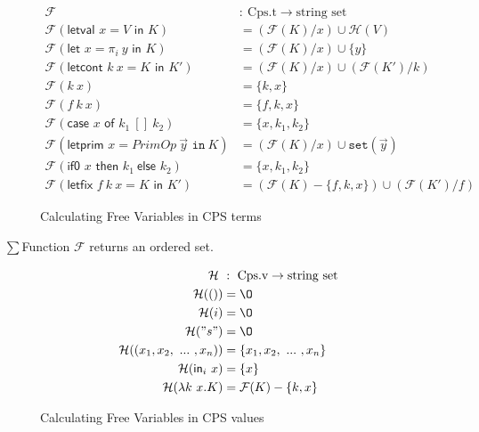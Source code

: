 \documentclass{article}
\theoremstyle{definition}
\theoremstyle{remark}
\numberwithin{equation}{section}
\begin{document}
\begin{figure}[!ht]
  \centering
\begin{align*}
\mathcal{F}\ &:\ \textrm{Cps.t} \to \textrm{string set}\\     %
\mathcal{F}(\textsf{letval }x=V\textsf{ in }K)
    &=(\mathcal{F}(K)/x)\cup \mathcal{H}(V)\\   %
\mathcal{F}(\textsf{let }x=\pi _i\ y\textsf{ in }K)
    &=(\mathcal{F}(K)/x)\cup \{y\}\\   %
\mathcal{F}(\textsf{letcont }k\ x=K\textsf{ in }K')
    &=(\mathcal{F}(K)/x)\cup (\mathcal{F}(K')/k)\\   %
\mathcal{F}(k\ x)
    &=\{k, x\}\\   %
\mathcal{F}(f\ k\ x)
    &=\{f, k, x\}\\   %
\mathcal{F}(\textsf{case }x\textsf{ of }k_1\ [\!]\ k_2)
    &=\{x, k_1, k_2\}\\   %
\mathcal{F}(\textsf{letprim }x=PrimOp\ \vec{y}\texttt{ in}\ K)
    &=(\mathcal{F}(K)/x)\cup \texttt{set}(\vec{y})\\   %
\mathcal{F}(\textsf{if0 }x\textsf{ then }k_1\ \textsf{else }k_2)
    &=\{x, k_1, k_2\}\\   %
\mathcal{F}(\textsf{letfix }f\ k\ x=K\textsf{ in }K')
    &=(\mathcal{F}(K)-\{f,k,x\})\cup (\mathcal{F}(K')/f)   %
\end{align*}
  \caption{Calculating Free Variables in CPS terms}
  \label{fig-sub}
\end{figure}

$\sum$Function $\mathcal{F}$ returns an ordered set.

\begin{figure}[!ht]
  \centering
\begin{align*}
\mathcal{H}\ &:\ \textrm{Cps.v} \to \textrm{string set}\\     %
\mathcal{H}(()) &={\O}\\   %
\mathcal{H}(i) &={\O}\\   %
\mathcal{H}("s") &={\O}\\   %
\mathcal{H}((x_1, x_2,\ ...\ , x_n)) &=\{x_1, x_2,\ ...\ , x_n\}\\   %
\mathcal{H}(\textsf{in}_i\ x) &= \{x\}\\        %
\mathcal{H}(\lambda k\ x.K) &= \mathcal{F}(K)-\{k, x\}      %
\end{align*}
  \caption{Calculating Free Variables in CPS values}
  \label{fig-sub}
\end{figure}
\end{document}
